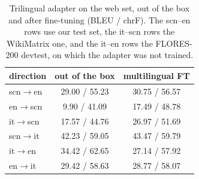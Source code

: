 \begin{table}[t]
\caption{Trilingual adapter on the web set, out of the box and after fine-tuning (BLEU / chrF). The
scn--en rows use our test set, the it--scn rows the WikiMatrix one, and the it--en rows the
FLORES-200 devtest, on which the adapter was not trained.}
\label{tab:italian}
\centering
\begin{tabular}{lcc}
\toprule
direction & out of the box & multilingual FT \\
\midrule
scn$\rightarrow$en & 29.00 / 55.23 & 30.75 / 56.57 \\
en$\rightarrow$scn & 9.90 / 41.09 & 17.49 / 48.78 \\
it$\rightarrow$scn & 17.57 / 44.76 & 26.97 / 51.69 \\
scn$\rightarrow$it & 42.23 / 59.05 & 43.47 / 59.79 \\
it$\rightarrow$en & 34.42 / 62.65 & 27.14 / 57.92 \\
en$\rightarrow$it & 29.42 / 58.63 & 28.77 / 58.07 \\
\bottomrule
\end{tabular}
\end{table}
